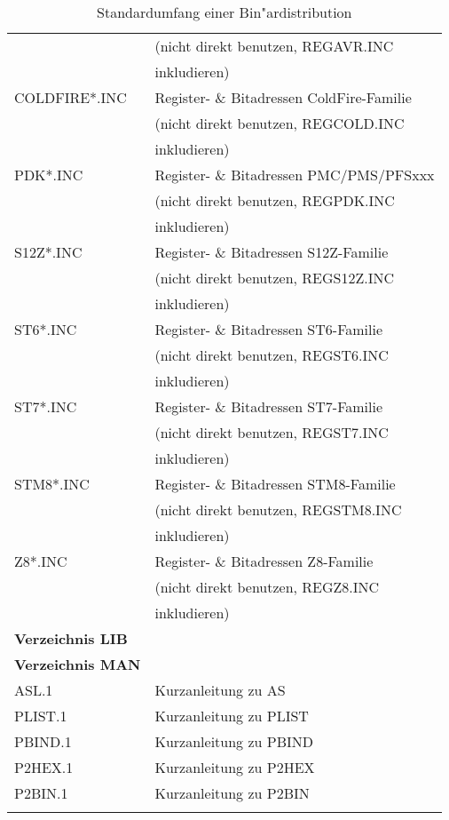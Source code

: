\documentclass[12pt,a4paper,twoside]{report}
\begin{document}
\begin{center}
\begin{longtable}{|l|l|}
                  & (nicht direkt benutzen, REGAVR.INC \\
                  & inkludieren) \\
COLDFIRE\/*.INC   & Register- \& Bitadressen ColdFire-Familie \\
                  & (nicht direkt benutzen, REGCOLD.INC \\
                  & inkludieren) \\
PDK\/*.INC        & Register- \& Bitadressen PMC/PMS/PFSxxx \\
                  & (nicht direkt benutzen, REGPDK.INC \\
                  & inkludieren) \\
S12Z\/*.INC       & Register- \& Bitadressen S12Z-Familie \\
                  & (nicht direkt benutzen, REGS12Z.INC \\
                  & inkludieren) \\
ST6\/*.INC        & Register- \& Bitadressen ST6-Familie \\
                  & (nicht direkt benutzen, REGST6.INC \\
                  & inkludieren) \\
ST7\/*.INC        & Register- \& Bitadressen ST7-Familie \\
                  & (nicht direkt benutzen, REGST7.INC \\
                  & inkludieren) \\
STM8\/*.INC       & Register- \& Bitadressen STM8-Familie \\
                  & (nicht direkt benutzen, REGSTM8.INC \\
                  & inkludieren) \\
Z8\/*.INC         & Register- \& Bitadressen Z8-Familie \\
                  & (nicht direkt benutzen, REGZ8.INC \\
                  & inkludieren) \\
\hline
{\bf Verzeichnis LIB} & \\
\hline
{\bf Verzeichnis MAN} & \\
\hline
ASL.1             & Kurzanleitung zu AS \\
PLIST.1           & Kurzanleitung zu PLIST \\
PBIND.1           & Kurzanleitung zu PBIND \\
P2HEX.1           & Kurzanleitung zu P2HEX \\
P2BIN.1           & Kurzanleitung zu P2BIN \\
\hline
\caption{Standardumfang einer Bin"ardistribution
 \label{TabCommonPackageList}}
\end{longtable}\end{center}
\end{document}
